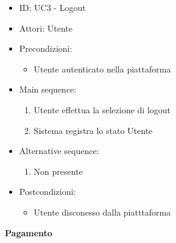 \documentclass{article}
\begin{document}
\begin{itemize}[label = { }]
    \itemsep0px
    \item ID: UC3 - Logout
    \item Attori: Utente
    \item Precondizioni: 
        \begin{itemize}[label = {-}]
            \item Utente autenticato nella piattaforma
        \end{itemize}
    \item Main sequence: 
        \begin{enumerate}
            \item Utente effettua la selezione di logout
            \item Sistema registra lo stato Utente
        \end{enumerate}
    \item Alternative sequence:
        \begin{enumerate}
            \item Non presente
        \end{enumerate}
    \item Postcondizioni: 
        \begin{itemize}[label = {-}]
            \item Utente disconesso dalla piatttaforma
        \end{itemize}
\end{itemize}
\textbf{Pagamento}
\end{document}
